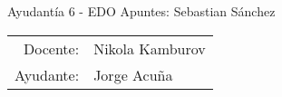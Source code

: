 




{\sc Ayudantía 6 - EDO \hfill \small \rm Apuntes: Sebastian Sánchez}

\begin{center}
    \begin{tabular}{rl}
        Docente:& Nikola Kamburov\\
        Ayudante:& Jorge Acuña
    \end{tabular}
\end{center}

\begin{problema}

\end{problema}

